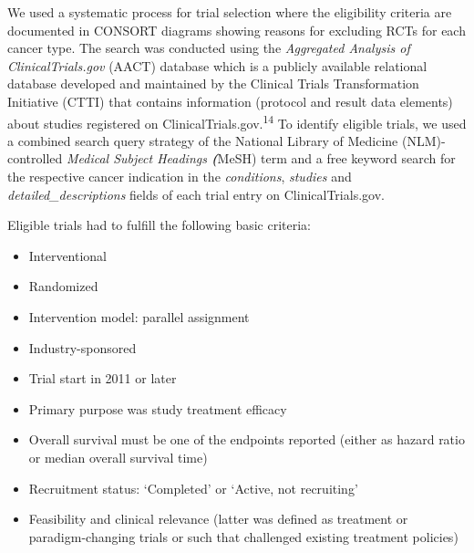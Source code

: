 \documentclass[
  letterpaper,
  DIV=11,
  numbers=noendperiod]{scrartcl}
\begin{document}
We used a systematic process for trial selection where the eligibility
criteria are documented in CONSORT diagrams showing reasons for
excluding RCTs for each cancer type. The search was conducted using the
\emph{Aggregated Analysis of ClinicalTrials.gov} (AACT) database which
is a publicly available relational database developed and maintained by
the Clinical Trials Transformation Initiative (CTTI) that contains
information (protocol and result data elements) about studies registered
on ClinicalTrials.gov.\textsuperscript{14} To identify eligible trials,
we used a combined search query strategy of the National Library of
Medicine (NLM)-controlled \emph{Medical Subject Headings
\textbf{(}}MeSH) term and a free keyword search for the respective
cancer indication in the \emph{conditions}, \emph{studies} and
\emph{detailed\_descriptions} fields of each trial entry on
ClinicalTrials.gov.

Eligible trials had to fulfill the following basic criteria:

\begin{itemize}
\item
  Interventional
\item
  Randomized
\item
  Intervention model: parallel assignment
\item
  Industry-sponsored
\item
  Trial start in 2011 or later
\item
  Primary purpose was study treatment efficacy
\item
  Overall survival must be one of the endpoints reported (either as
  hazard ratio or median overall survival time)
\item
  Recruitment status: `Completed' or `Active, not recruiting'
\item
  Feasibility and clinical relevance (latter was defined as treatment or
  paradigm-changing trials or such that challenged existing treatment
  policies)
\end{itemize}
\end{document}
